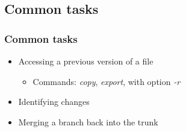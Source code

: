 \documentclass{beamer}
\begin{document}
\subsection{Common tasks}

\frame
{
  \frametitle{Common tasks}
  
  \begin{itemize}
  \item<1-> Accessing a previous version of a file
  	\begin{itemize}
	\item<1-> Commands: \textit{copy}, \textit{export}, with option \textit{-r}
	\end{itemize}
  \item<2-> Identifying changes
  \item<3-> Merging a branch back into the trunk
  \end{itemize}
  
}  
\end{document}
